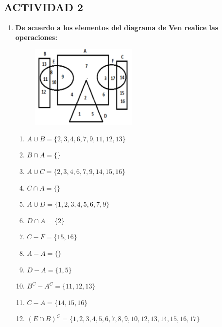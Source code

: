 \documentclass[12pt]{article}
\begin{document}
            \newpage
            \subsection*{\textbf{\centering ACTIVIDAD 2}}

            \begin{enumerate}
                \item \textbf{De acuerdo a los elementos del diagrama de Ven realice las operaciones:}
                    \begin{figure}[!h]
                        \centering
                        \includegraphics[width=0.5\textwidth]{Img/Tarea2/DiagVennActividad2.png}
                    \end{figure}

                    \begin{enumerate}
                        \item $A \cup B = \{2, 3, 4, 6, 7, 9, 11, 12, 13\}$
                        \item $B \cap A = \{\}$
                        \item $A \cup C = \{2, 3, 4, 6, 7, 9, 14, 15, 16\}$
                        \item $C \cap A = \{\}$
                        \item $A \cup D = \{1, 2, 3, 4, 5, 6, 7, 9\}$
                        \item $D \cap A = \{2\}$
                        \item $C - F = \{15, 16\}$
                        \item $A - A = \{\}$
                        \item $D - A = \{1, 5\}$
                        \item $B^C - A^C = \{11, 12, 13\}$
                        \item $C - A = \{14, 15, 16\}$
                        \item $(E \cap B)^C = \{1, 2, 3, 4, 5, 6, 7, 8, 9, 10, 12, 13, 14, 15, 16, 17\}$
                    \end{enumerate}
            \end{enumerate}
\end{document}
